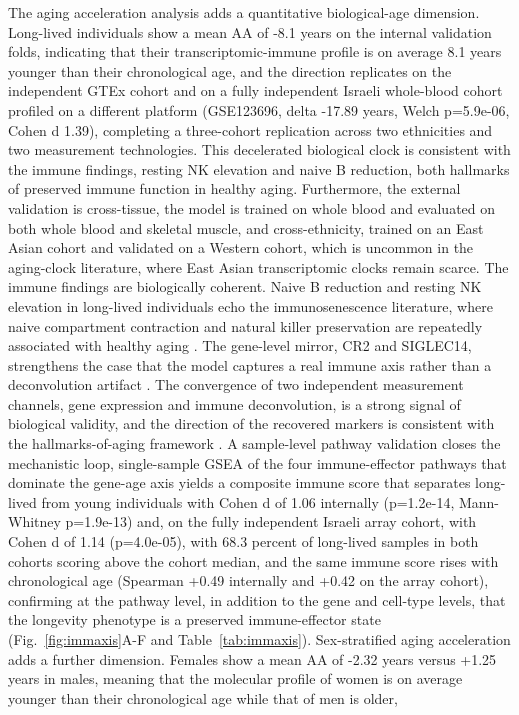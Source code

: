 \documentclass[unnumsec,webpdf,contemporary,large]{oup-authoring-template}
\begin{document}
The aging acceleration analysis adds a quantitative biological-age dimension. Long-lived individuals show a mean AA of -8.1 years on the internal validation folds, indicating that their transcriptomic-immune profile is on average 8.1 years younger than their chronological age, and the direction replicates on the independent GTEx cohort and on a fully independent Israeli whole-blood cohort profiled on a different platform (GSE123696, delta -17.89 years, Welch p=5.9e-06, Cohen d 1.39), completing a three-cohort replication across two ethnicities and two measurement technologies. This decelerated biological clock is consistent with the immune findings, resting NK elevation and naive B reduction, both hallmarks of preserved immune function in healthy aging. Furthermore, the external validation is cross-tissue, the model is trained on whole blood and evaluated on both whole blood and skeletal muscle, and cross-ethnicity, trained on an East Asian cohort and validated on a Western cohort, which is uncommon in the aging-clock literature, where East Asian transcriptomic clocks remain scarce. The immune findings are biologically coherent. Naive B reduction and resting NK elevation in long-lived individuals echo the immunosenescence literature, where naive compartment contraction and natural killer preservation are repeatedly associated with healthy aging \cite{franceschi2018inflammaging,goronzy2017fifty,fulop2018immunosenescence,grubeck2017human,pinti2017centenarian,wang2025immune,dato_2019,villeda_2011,kowalczyk_2014,adrover2019neutrophil,campos2014natural,chen2019age,fulop2004neutrophil,pararasa2015neutrophil,rubtsov2011toll,tseng2012neutrophil,aizawa_1980,goronzy2021hallmarks,mittelbrunn2021tcell,mogilenko2021immuneageing,zhang2023inflammaging}. The gene-level mirror, CR2 and SIGLEC14, strengthens the case that the model captures a real immune axis rather than a deconvolution artifact \cite{hashimoto2019single,kamada2020single,wu2024immune,liu2025longevity,mogilenko2021immuneageing}. The convergence of two independent measurement channels, gene expression and immune deconvolution, is a strong signal of biological validity, and the direction of the recovered markers is consistent with the hallmarks-of-aging framework \cite{lopez2013hallmarks,lopez2023hallmarks}. A sample-level pathway validation closes the mechanistic loop, single-sample GSEA of the four immune-effector pathways that dominate the gene-age axis yields a composite immune score that separates long-lived from young individuals with Cohen d of 1.06 internally (p=1.2e-14, Mann-Whitney p=1.9e-13) and, on the fully independent Israeli array cohort, with Cohen d of 1.14 (p=4.0e-05), with 68.3 percent of long-lived samples in both cohorts scoring above the cohort median, and the same immune score rises with chronological age (Spearman +0.49 internally and +0.42 on the array cohort), confirming at the pathway level, in addition to the gene and cell-type levels, that the longevity phenotype is a preserved immune-effector state (Fig.~\ref{fig:immaxis}A-F and Table~\ref{tab:immaxis}). Sex-stratified aging acceleration adds a further dimension. Females show a mean AA of -2.32 years versus +1.25 years in males, meaning that the molecular profile of women is on average younger than their chronological age while that of men is older, 
\end{document}
